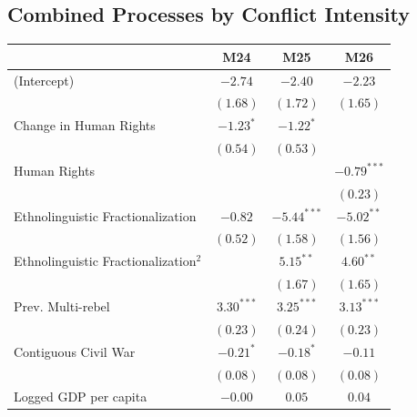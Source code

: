 \documentclass[12pt,]{book}
\let\origtable\table
\let\endorigtable\endtable
\renewenvironment{table}[1][2] {
    \singlespacing
    \expandafter\origtable\expandafter[H]
} {
    \endorigtable
}
\theoremstyle{definition}
\theoremstyle{definition}
\theoremstyle{definition}
\theoremstyle{remark}
\begin{document}
\hypertarget{combined-processes-by-conflict-intensity}{%
\subsection*{Combined Processes by Conflict
Intensity}\label{combined-processes-by-conflict-intensity}}

\begin{table}
\begin{center}
\begin{tabular}{l c c c }
\hline
 & M24 & M25 & M26 \\
\hline
(Intercept)                             & $-2.74$      & $-2.40$       & $-2.23$       \\
                                        & $(1.68)$     & $(1.72)$      & $(1.65)$      \\
Change in Human Rights                  & $-1.23^{*}$  & $-1.22^{*}$   &               \\
                                        & $(0.54)$     & $(0.53)$      &               \\
Human Rights                            &              &               & $-0.79^{***}$ \\
                                        &              &               & $(0.23)$      \\
Ethnolinguistic Fractionalization       & $-0.82$      & $-5.44^{***}$ & $-5.02^{**}$  \\
                                        & $(0.52)$     & $(1.58)$      & $(1.56)$      \\
Ethnolinguistic Fractionalization$^{2}$ &              & $5.15^{**}$   & $4.60^{**}$   \\
                                        &              & $(1.67)$      & $(1.65)$      \\
Prev. Multi-rebel                       & $3.30^{***}$ & $3.25^{***}$  & $3.13^{***}$  \\
                                        & $(0.23)$     & $(0.24)$      & $(0.23)$      \\
Contiguous Civil War                    & $-0.21^{*}$  & $-0.18^{*}$   & $-0.11$       \\
                                        & $(0.08)$     & $(0.08)$      & $(0.08)$      \\
Logged GDP per capita                   & $-0.00$      & $0.05$        & $0.04$        \\

\end{tabular}
\end{center}
\end{table}
\end{document}
